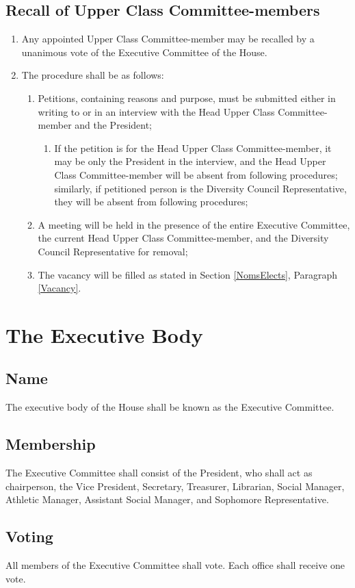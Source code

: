 \documentclass[10pt]{article} %
\begin{document}
\subsection{Recall of Upper Class Committee-members}
\begin{enumerate}
\item Any appointed Upper Class Committee-member may be recalled by a unanimous vote of the Executive Committee of the House. 
\item The procedure shall be as follows:
\begin{enumerate}
\item Petitions, containing reasons and purpose, must be submitted either in writing to or in an interview with the Head Upper Class Committee-member and the President;
\begin{enumerate}
	\item If the petition is for the Head Upper Class Committee-member, it may be only the President in the interview, and the Head Upper Class Committee-member will be absent from following procedures; similarly, if petitioned person is the Diversity Council Representative, they will be absent from following procedures;
\end{enumerate}
\item A meeting will be held in the presence of the entire Executive Committee, the current Head Upper Class Committee-member, and the Diversity Council Representative for removal;
\item The vacancy will be filled as stated in Section \ref{NomsElects}, Paragraph \ref{Vacancy}.
\end{enumerate}
\end{enumerate}
\section{The Executive Body}
\subsection{Name}
The executive body of the House shall be known as the Executive Committee.
\subsection{Membership}
The Executive Committee shall consist of the President, who shall act as chairperson, the Vice President, Secretary, Treasurer, Librarian, Social Manager, Athletic Manager, Assistant Social Manager, and Sophomore Representative.
\subsection{Voting}
All members of the Executive Committee shall vote. Each office shall receive one vote.
\end{document}
